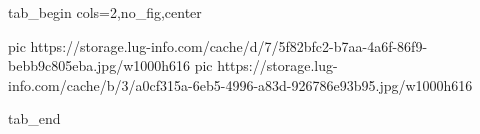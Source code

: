  
 
 
 
 


\ifcmt
  tab_begin cols=2,no_fig,center

     pic https://storage.lug-info.com/cache/d/7/5f82bfc2-b7aa-4a6f-86f9-bebb9c805eba.jpg/w1000h616
		 pic https://storage.lug-info.com/cache/b/3/a0cf315a-6eb5-4996-a83d-926786e93b95.jpg/w1000h616

  tab_end
\fi
